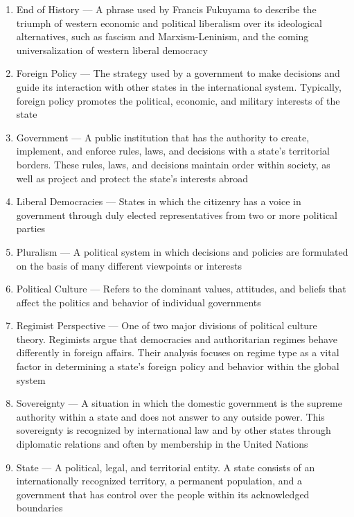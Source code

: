 \documentclass[12pt]{article}
\begin{document}
\begin{enumerate}
\begin{enumerate}
          \item End of History — A phrase used by Francis Fukuyama to describe the triumph of western economic and political liberalism over its ideological alternatives, such as fascism and Marxism-Leninism, and the coming universalization of western liberal democracy

          \item Foreign Policy — The strategy used by a government to make decisions and guide its interaction with other states in the international system.  Typically, foreign policy promotes the political, economic, and military interests of the state

          \item Government — A public institution that has the authority to create, implement, and enforce rules, laws, and decisions with a state’s territorial borders.  These rules, laws, and decisions maintain order within society, as well as project and protect the state’s interests abroad

          \item Liberal Democracies — States in which the citizenry has a voice in government through duly elected representatives from two or more political parties

          \item Pluralism — A political system in which decisions and policies are formulated on the basis of many different viewpoints or interests

          \item Political Culture — Refers to the dominant values, attitudes, and beliefs that affect the politics and behavior of individual governments

          \item Regimist Perspective — One of two major divisions of political culture theory. Regimists argue that democracies and authoritarian regimes behave differently in foreign affairs. Their analysis focuses on regime type as a vital factor in determining a state’s foreign policy and behavior within the global system

          \item Sovereignty — A situation in which the domestic government is the supreme authority within a state and does not answer to any outside power. This sovereignty is recognized by international law and by other states through diplomatic relations and often by membership in the United Nations

          \item State — A political, legal, and territorial entity. A state consists of an internationally recognized territory, a permanent population, and a government that has control over the people within its acknowledged boundaries


\end{enumerate}
\end{enumerate}
\end{document}
